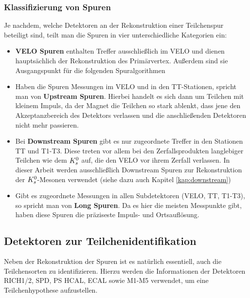\subsubsection{Klassifizierung von Spuren} \label{kap:spurklassen}
Je nachdem, welche Detektoren an der Rekonstruktion einer Teilchenspur beteiligt sind, teilt man die Spuren in vier unterschiedliche Kategorien ein:
\begin{itemize}
\item \textbf{VELO Spuren} enthalten Treffer ausschließlich im VELO und dienen hauptsächlich der Rekonstruktion des Primärvertex. Außerdem sind sie Ausgangspunkt für die folgenden Spuralgorithmen
\item Haben die Spuren Messungen im VELO und in den TT-Stationen, spricht man von \textbf{Upstream Spuren}. Hierbei handelt es sich dann um Teilchen mit kleinem Impuls, da der Magnet die Teilchen so stark ablenkt, dass jene den Akzeptanzbereich des Detektors verlassen und die anschließenden Detektoren nicht mehr passieren.
\item Bei \textbf{Downstream Spuren} gibt es nur zugeordnete Treffer in den Stationen TT und T1-T3. Diese treten vor allem bei den Zerfallsprodukten langlebiger Teilchen wie dem $K_s^0$ auf, die den VELO vor ihrem Zerfall verlassen. In dieser Arbeit werden ausschließlich Downstream Spuren zur Rekonstruktion der $K_s^0$-Mesonen verwendet (siehe dazu auch Kapitel \ref{kap:downstream})
\item Gibt es zugeordnete Messungen in allen Subdetektoren (VELO, TT, T1-T3), so spricht man von \textbf{Long Spuren}. Da es hier die meisten Messpunkte gibt, haben diese Spuren die präziseste Impuls- und Ortsauflösung. \cite{thesis_linn}
\end{itemize}

\subsection{Detektoren zur Teilchenidentifikation}
Neben der Rekonstruktion der Spuren ist es natürlich essentiell, auch die Teilchensorten zu identifizieren. Hierzu werden die Informationen der Detektoren RICH1/2, SPD, PS HCAL, ECAL sowie M1-M5 verwendet, um eine Teilchenhypothese aufzustellen.

